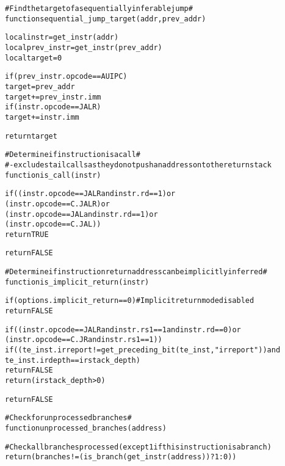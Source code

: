 \begin{alltt}
# Find the target of a sequentially inferable jump #
function sequential_jump_target (addr, prev_addr)

  local instr      = get_instr(addr)
  local prev_instr = get_instr(prev_addr)
  local target     = 0

  if (prev_instr.opcode == AUIPC)
    target = prev_addr
  target += prev_instr.imm
  if (instr.opcode == JALR)
    target += instr.imm

  return target

# Determine if instruction is a call #
# - excludes tail calls as they do not push an address onto the return stack
function is_call (instr)

  if ((instr.opcode == JALR and instr.rd == 1) or
      (instr.opcode == C.JALR)                 or
      (instr.opcode == JAL  and instr.rd == 1) or
      (instr.opcode == C.JAL))
    return TRUE

  return FALSE

# Determine if instruction return address can be implicitly inferred #
function is_implicit_return (instr)

  if (options.implicit_return == 0) # Implicit return mode disabled
    return FALSE

  if ((instr.opcode == JALR and instr.rs1 == 1 and instr.rd == 0) or
      (instr.opcode == C.JR and instr.rs1 == 1))
    if ((te_inst.irreport != get_preceding_bit(te_inst, "irreport")) and 
         te_inst.irdepth == irstack_depth)
      return FALSE 
    return (irstack_depth > 0)

  return FALSE

# Check for unprocessed branches #
function unprocessed_branches (address)

  # Check all branches processed (except 1 if this instruction is a branch)
  return (branches != (is_branch(get_instr(address)) ? 1 : 0))

\end{alltt}

\pagebreak

